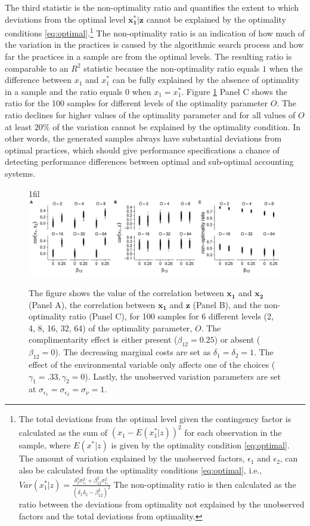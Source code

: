 \documentclass[12pt]{article}
\makeatletter
\newcommand*{\centerfloat}{%
  \parindent \z@
  \leftskip \z@ \@plus 1fil \@minus \textwidth
  \rightskip\leftskip
  \parfillskip \z@skip}
\makeatother
\begin{document}
The third statistic is the non-optimality ratio and quantifies the extent to which deviations from the optimal level $\mathbf{x^*_1|z}$ cannot be explained by the optimality conditions \eqref{eq:optimal}.\footnote{The total deviations from the optimal level given the contingency factor is calculated as the sum of $(x_1 - E(x_1^*|z))^2$ for each observation in the sample, where $E(x^*|z)$ is given by the optimality condition \eqref{eq:optimal}. The amount of variation explained by the unobserved factors, $\epsilon_1$ and $\epsilon_2$, can also be calculated from the optimality conditions \eqref{eq:optimal}, i.e., $Var(x_1^*|z) = \frac{\delta_2^2 \sigma_{\epsilon_1}^2 + \beta_{12}^2 \sigma_{\epsilon_1}^2}{(\delta_1 \delta_2 - \beta_{12}^2)^2}$
The non-optimality ratio is then calculated as the ratio between the deviations from optimality not explained by the unobserved factors and the total deviations from optimality.} The non-optimality ratio is an indication of how much of the variation in the practices is caused by the algorithmic search process and how far the practices in a sample are from the optimal levels. The resulting ratio is comparable to an $R^2$ statistic because the non-optimality ratio equals $1$ when the difference between $x_1$ and $x^*_1$ can be fully explained by the absence of optimality in a sample and the ratio equals $0$ when $x_1 = x^*_1$. Figure \ref{calibration} Panel C shows the ratio for the 100 samples for different levels of the optimality parameter $O$. The ratio declines for higher values of the optimality parameter and for all values of $O$ at least $20\%$ of the variation cannot be explained by the optimality condition. In other words, the generated samples always have substantial deviations from optimal practices, which should give performance specifications a chance of detecting performance differences between optimal and sub-optimal accounting systems. 

\begin{figure}
\centerfloat
\includegraphics[width=450px]{figure-latex/sample_descriptives.pdf}
\caption[Calibration of Simulated Samples]{\label{calibration} The figure shows the value of the correlation between $\mathbf{x_1}$ and $\mathbf{x_2}$ (Panel A), the correlation between $\mathbf{x_1}$ and $\mathbf{z}$ (Panel B), and the non-optimality ratio (Panel C),  for 100 samples for 6 different levels (2, 4, 8, 16, 32, 64) of the optimality parameter, $O$. The complimentarity effect is either present ($\beta_{12} = 0.25$) or absent ($\beta_{12} = 0$). The decreasing marginal costs are set as $\delta_1 = \delta_2 = 1$. The effect of the environmental variable only affects one of the choices
($\gamma_1 = .33, \gamma_2 = 0$). Lastly, the unobserved variation parameters are set at $\sigma_{\epsilon_1} = \sigma_{\epsilon_2} = \sigma_{\nu} = 1.$}
\end{figure}
\end{document}
